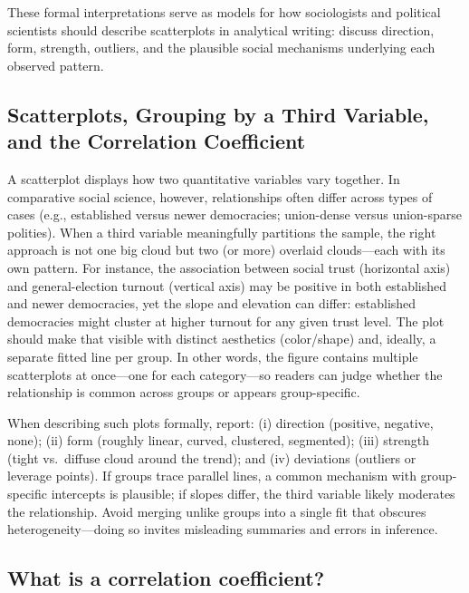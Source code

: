 \documentclass[
  letterpaper,
  DIV=11,
  numbers=noendperiod]{scrreprt}
\begin{document}
These formal interpretations serve as models for how sociologists and
political scientists should describe scatterplots in analytical writing:
discuss direction, form, strength, outliers, and the plausible social
mechanisms underlying each observed pattern.

\subsection{Scatterplots, Grouping by a Third Variable, and the
Correlation
Coefficient}\label{scatterplots-grouping-by-a-third-variable-and-the-correlation-coefficient}

A scatterplot displays how two quantitative variables vary together. In
comparative social science, however, relationships often differ across
types of cases (e.g., established versus newer democracies; union-dense
versus union-sparse polities). When a third variable meaningfully
partitions the sample, the right approach is not one big cloud but two
(or more) overlaid clouds---each with its own pattern. For instance, the
association between social trust (horizontal axis) and general-election
turnout (vertical axis) may be positive in both established and newer
democracies, yet the slope and elevation can differ: established
democracies might cluster at higher turnout for any given trust level.
The plot should make that visible with distinct aesthetics (color/shape)
and, ideally, a separate fitted line per group. In other words, the
figure contains multiple scatterplots at once---one for each
category---so readers can judge whether the relationship is common
across groups or appears group-specific.

When describing such plots formally, report: (i) direction (positive,
negative, none); (ii) form (roughly linear, curved, clustered,
segmented); (iii) strength (tight vs.~diffuse cloud around the trend);
and (iv) deviations (outliers or leverage points). If groups trace
parallel lines, a common mechanism with group-specific intercepts is
plausible; if slopes differ, the third variable likely moderates the
relationship. Avoid merging unlike groups into a single fit that
obscures heterogeneity---doing so invites misleading summaries and
errors in inference.

\subsection{What is a correlation
coefficient?}\label{what-is-a-correlation-coefficient}
\end{document}
